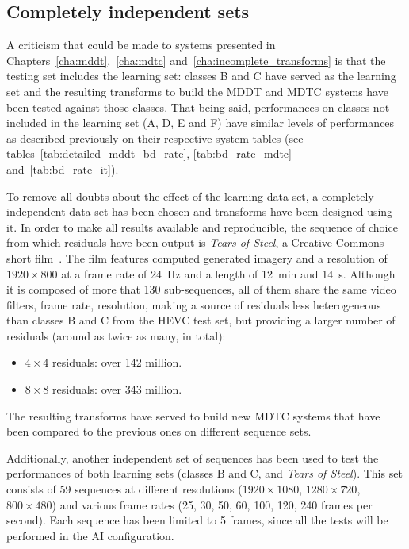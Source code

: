 \documentclass[11pt,a4paper,openright,twoside]{book}
\numberwithin{equation}{section} %
\numberwithin{figure}{section} %
\numberwithin{table}{section} %
\begin{document}
\subsection{Completely independent sets}
\label{sub:rw_completely_independent_sets}

A criticism that could be made to systems presented in
Chapters~\ref{cha:mddt},~\ref{cha:mdtc} and~\ref{cha:incomplete_transforms} is
that the testing set includes the learning set:
classes B and C have served as the learning set and the resulting transforms
to build the \ac{MDDT} and \ac{MDTC} systems have been tested against those
classes.
That being said, performances on classes not included in the learning set (A,
D, E and F) have similar levels of performances as described previously on
their respective system tables (see tables~\ref{tab:detailed_mddt_bd_rate},
\ref{tab:bd_rate_mdtc} and~\ref{tab:bd_rate_it}).

To remove all doubts about the effect of the learning data set, a completely
independent data set has been chosen and transforms have been designed using
it.
In order to make all results available and reproducible, the sequence of
choice from which residuals have been output is \emph{Tears of Steel}, a
Creative Commons short film~\cite{blender-tearsofsteel}.
The film features computed generated imagery and a resolution of
$1920\times800$ at a frame rate of \SI{24}{\hertz} and a length of
\SI{12}{\minute} and \SI{14}{\second}.
Although it is composed of more that 130 sub-sequences, all of them share the
same video filters, frame rate, resolution, making a source of residuals less
heterogeneous than classes B and C from the \ac{HEVC} test set, but providing
a larger number of residuals (around as twice as many, in total):
\begin{itemize}
	\item $4\times4$ residuals: over 142 million.
	\item $8\times8$ residuals: over 343 million.
\end{itemize}

The resulting transforms have served to build new \ac{MDTC} systems that have
been compared to the previous ones on different sequence sets.

Additionally, another independent set of sequences has been used to test the
performances of both learning sets (classes B and C, and \emph{Tears of
Steel}).
This set consists of 59 sequences at different resolutions ($1920\times1080$,
$1280\times720$, $800\times480$) and various frame rates (25, 30, 50, 60, 100,
120, 240 frames per second).
Each sequence has been limited to 5 frames, since all the tests will be
performed in the \ac{AI} configuration.
\end{document}
